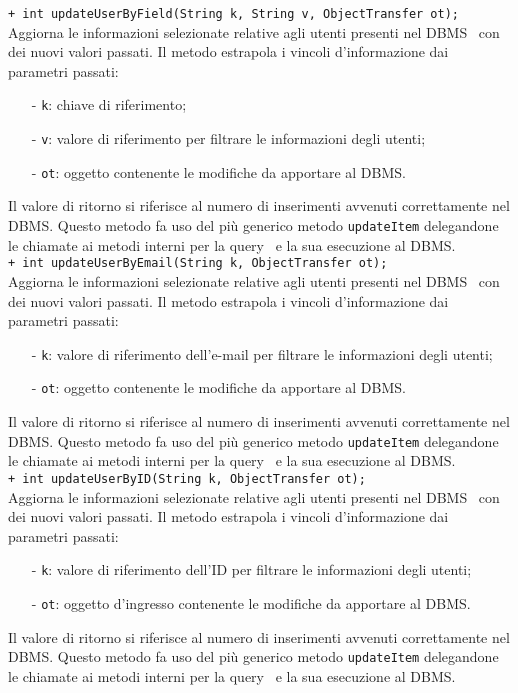 {\begin{sloppypar}
{{{{\begin{itemize}
{				\texttt{+ int updateUserByField(String k, String v, ObjectTransfer ot);}\\
				Aggiorna le informazioni selezionate relative agli utenti presenti nel DBMS\g~ con dei nuovi valori passati.
				Il metodo estrapola i vincoli d'informazione dai parametri passati:
				\begin{itemize}
					\item[-] \texttt{k}: chiave di riferimento;
					\item[-] \texttt{v}: valore di riferimento per filtrare le informazioni degli utenti;
					\item[-] \texttt{ot}: oggetto contenente le modifiche da apportare al DBMS\g.
				\end{itemize}
				Il valore  di ritorno si riferisce al numero di inserimenti avvenuti correttamente nel DBMS\g.
				Questo metodo fa uso del più generico metodo \texttt{updateItem} delegandone le chiamate ai metodi interni per la query\g~ e la sua esecuzione al DBMS\g.\\
				
				\texttt{+ int updateUserByEmail(String k, ObjectTransfer ot);}\\
				Aggiorna le informazioni selezionate relative agli utenti presenti nel DBMS\g~ con dei nuovi valori passati.
				Il metodo estrapola i vincoli d'informazione dai parametri passati:
				\begin{itemize}
					\item[-] \texttt{k}: valore di riferimento dell'e-mail per filtrare le informazioni degli utenti;
					\item[-] \texttt{ot}: oggetto contenente le modifiche da apportare al DBMS\g.
				\end{itemize}
				Il valore  di ritorno si riferisce al numero di inserimenti avvenuti correttamente nel DBMS\g.
				Questo metodo fa uso del più generico metodo \texttt{updateItem} delegandone le chiamate ai metodi interni per la query\g~ e la sua esecuzione al DBMS\g.\\
				
				\texttt{+ int updateUserByID(String k, ObjectTransfer ot);}\\
				Aggiorna le informazioni selezionate relative agli utenti presenti nel DBMS\g~ con dei nuovi valori passati.
				Il metodo estrapola i vincoli d'informazione dai parametri passati:
				\begin{itemize}
					\item[-] \texttt{k}: valore di riferimento dell'ID per filtrare le informazioni degli utenti;
					\item[-] \texttt{ot}: oggetto d'ingresso contenente le modifiche da apportare al DBMS\g.
				\end{itemize}
				Il valore  di ritorno si riferisce al numero di inserimenti avvenuti correttamente nel DBMS\g.
				Questo metodo fa uso del più generico metodo \texttt{updateItem} delegandone le chiamate ai metodi interni per la query\g~ e la sua esecuzione al DBMS\g.\\
				
}
\end{itemize}}}}}
\end{sloppypar}}
